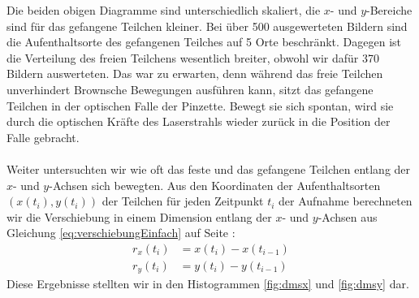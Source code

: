 \documentclass[a4paper,titlepage]{scrartcl}
\numberwithin{equation}{section}
\begin{document}
Die beiden obigen Diagramme sind unterschiedlich skaliert, die $x$- und $y$-Bereiche sind für das gefangene Teilchen kleiner. Bei über 500 ausgewerteten Bildern sind die Aufenthaltsorte des gefangenen Teilches auf 5 Orte beschränkt. Dagegen ist die Verteilung des freien Teilchens wesentlich breiter, obwohl wir dafür 370 Bildern auswerteten. Das war zu erwarten, denn während das freie Teilchen unverhindert Brownsche Bewegungen ausführen kann, sitzt das gefangene Teilchen in der optischen Falle der Pinzette. Bewegt sie sich spontan, wird sie durch die optischen Kräfte des Laserstrahls wieder zurück in die Position der Falle gebracht.\\ \\
Weiter untersuchten wir wie oft das feste und das gefangene Teilchen entlang der $x$- und $y$-Achsen sich bewegten. Aus den Koordinaten der Aufenthaltsorten $(x(t_i),y(t_i))$ der Teilchen für jeden Zeitpunkt $t_i$ der Aufnahme berechneten wir die Verschiebung in einem Dimension entlang der $x$- und $y$-Achsen aus Gleichung \ref{eq:verschiebungEinfach} auf Seite \pageref{eq:verschiebungEinfach}:
\begin{align*}
r_x(t_i)&=x(t_i)-x(t_{i-1})\\
r_y(t_i)&=y(t_i)-y(t_{i-1})
\end{align*}
Diese Ergebnisse stellten wir in den Histogrammen \ref{fig:dmsx} und \ref{fig:dmsy} dar.
\end{document}
